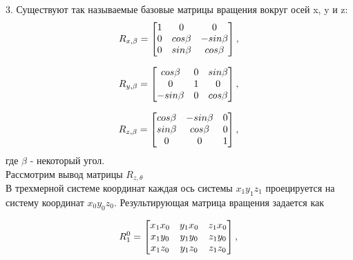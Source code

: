 3. Существуют так называемые базовые матрицы вращения вокруг осей x, y и z:
\begin{equation*}\label{eq:model}
R_{x, \beta} = 
     \begin{bmatrix}
    1 & 0 & 0\\
    0 & cos\beta & -sin\beta\\
    0 & sin\beta & cos\beta\\
    \end{bmatrix}
    , \\
\end{equation*} 

\begin{equation*}\label{eq:model}
R_{y, \beta} = 
     \begin{bmatrix}
    cos\beta & 0 & sin\beta\\
    0 & 1 & 0\\
    -sin\beta & 0 & cos\beta\\
    \end{bmatrix}
    , \\
\end{equation*} 

\begin{equation*}\label{eq:model}
R_{z, \beta} = 
     \begin{bmatrix}
   
    cos\beta & -sin\beta & 0\\
    sin\beta & cos\beta & 0\\
    0 & 0 & 1\\
    \end{bmatrix}
    , \\
\end{equation*} 
где $\beta$ - некоторый угол.\\

\hspace*{\parindent} Рассмотрим вывод матрицы $R_{z,\theta}$\\
\hspace*{\parindent}В трехмерной системе координат каждая ось системы $x
_1y_1z_1$ проецируется на систему координат $x_0y_0z_0$. Результирующая матрица вращения задается как

\begin{equation*}\label{eq:model}
R_1^0 = 
     \begin{bmatrix}
x_1x_0 & y_1x_0 & z_1x_0 \\
x_1y_0 & y_1y_0 & z_1y_0\\
x_1z_0 & y_1z_0 & z_1z_0\\
    \end{bmatrix}
    , \\
\end{equation*} 

